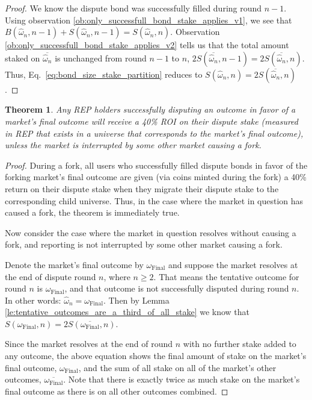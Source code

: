 \documentclass[floatfix,reprint,nofootinbib,amsmath,amssymb,epsfig,pre,floats,letterpaper,groupedaffiliation]{revtex4-1}
\newtheorem{theorem}{Theorem}
\theoremstyle{definition}
\theoremstyle{definition}
\begin{document}
\begin{appendix}
\begin{proof}
We know the dispute bond was successfully filled during round $n-1$.  Using observation \ref{ob:only_successfull_bond_stake_applies_v1}, we see that $B(\hat{\omega}_{n},n-1) + S(\hat{\omega}_{n},n-1) = S(\hat{\omega}_{n},n)$.  Observation \ref{ob:only_successfull_bond_stake_applies_v2} tells us that the total amount staked on $\overline{\hat{\omega}_{n}}$ is unchanged from round $n-1$ to $n$, $2S(\overline{\hat{\omega}_{n}},n-1) = 2S(\overline{\hat{\omega}_{n}},n)$.  Thus, Eq.~\ref{eq:bond_size_stake_partition} reduces to $S(\hat{\omega}_{n},n) = 2S(\overline{\hat{\omega}_{n}},n)$.
\end{proof}

\begin{theorem}\label{th:roi_guarantee}
Any REP holders successfully disputing an outcome in favor of a market's final outcome will receive a 40\% ROI on their dispute stake (measured in REP that exists in a universe that corresponds to the market's final outcome), unless the market is interrupted by some other market causing a fork.
\end{theorem}

\begin{proof}
During a fork, all users who successfully filled dispute bonds in favor of the forking market's final outcome are given (via coins minted during the fork) a 40\% return on their dispute stake when they migrate their dispute stake to the corresponding child universe. Thus, in the case where the market in question has caused a fork, the theorem is immediately true.

Now consider the case where the market in question resolves without causing a fork, and reporting is not interrupted by some other market causing a fork.

Denote the market's final outcome by $\omega_{\mathrm{Final}}$ and suppose the market resolves at the end of dispute round $n$, where $n \geq 2$. That means the tentative outcome for round $n$ is $\omega_{\mathrm{Final}}$, and that outcome is not successfully disputed during round $n$. In other words: $\hat{\omega}_{n} = \omega_{\mathrm{Final}}$. Then by Lemma \ref{le:tentative_outcomes_are_a_third_of_all_stake} we know that
$ S(\omega_{\mathrm{Final}},n) = 2S(\overline{\omega_{\mathrm{Final}}},n)$.

Since the market resolves at the end of round $n$ with no further stake added to any outcome, the above equation shows the final amount of stake on the market's final outcome, $\omega_{\mathrm{Final}}$, and the sum of all stake on all of the market's other outcomes, $\overline{\omega_{\mathrm{Final}}}$. Note that there is exactly twice as much stake on the market's final outcome as there is on all other outcomes combined.


\end{proof}
\end{appendix}
\end{document}
